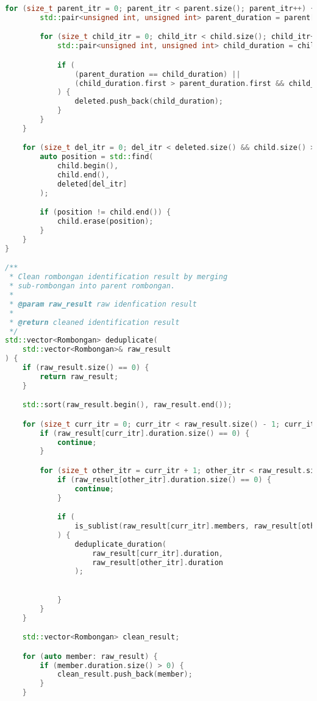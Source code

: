 \begin{lstlisting}[language=C++, caption=Implementasi modul \texttt{rombongan.cpp}, label={lamp:module-rombongan}]
    for (size_t parent_itr = 0; parent_itr < parent.size(); parent_itr++) {
        std::pair<unsigned int, unsigned int> parent_duration = parent[parent_itr];

        for (size_t child_itr = 0; child_itr < child.size(); child_itr++) {
            std::pair<unsigned int, unsigned int> child_duration = child[child_itr];

            if (
                (parent_duration == child_duration) ||
                (child_duration.first > parent_duration.first && child_duration.second < parent_duration.second)
            ) {
                deleted.push_back(child_duration);
            }
        }
    }

    for (size_t del_itr = 0; del_itr < deleted.size() && child.size() > 0; del_itr++) {
        auto position = std::find(
            child.begin(),
            child.end(),
            deleted[del_itr]
        );

        if (position != child.end()) {
            child.erase(position);
        }
    }
}

/**
 * Clean rombongan identification result by merging
 * sub-rombongan into parent rombongan.
 * 
 * @param raw_result raw idenfication result
 *
 * @return cleaned identification result
 */
std::vector<Rombongan> deduplicate(
    std::vector<Rombongan>& raw_result
) {
    if (raw_result.size() == 0) {
        return raw_result;
    }

    std::sort(raw_result.begin(), raw_result.end());

    for (size_t curr_itr = 0; curr_itr < raw_result.size() - 1; curr_itr++) {
        if (raw_result[curr_itr].duration.size() == 0) {
            continue;
        }

        for (size_t other_itr = curr_itr + 1; other_itr < raw_result.size(); other_itr++) {
            if (raw_result[other_itr].duration.size() == 0) {
                continue;
            }

            if (
                is_sublist(raw_result[curr_itr].members, raw_result[other_itr].members)
            ) {
                deduplicate_duration(
                    raw_result[curr_itr].duration,
                    raw_result[other_itr].duration
                );

                
            }
        }
    }

    std::vector<Rombongan> clean_result;

    for (auto member: raw_result) {
        if (member.duration.size() > 0) {
            clean_result.push_back(member);
        }
    }


\end{lstlisting}
